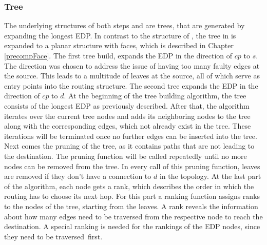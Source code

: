 \documentclass[conference]{IEEEtran}
\begin{document}
\subsubsection{Tree}
\label{precompTree}
The underlying structures of both steps  and  are trees, that are generated by expanding the longest EDP.
In contrast to the structure of , the tree in  is expanded to a planar structure with faces, which is described in Chapter \ref{precompFace}. 
The first tree build, expands the EDP in the direction of $cp$ to $s$.
The direction was chosen to address the issue of having too many faulty edges at the source. This leads to a multitude of leaves at the source, all of which serve as entry points into the routing structure.
The second tree expands the EDP in the direction of $cp$ to $d$.
At the beginning of the tree building algorithm, the tree consists of the longest EDP as previously described.
After that, the algorithm iterates over the current tree nodes and adds its neighboring nodes to the tree along with the corresponding edges, which not already exist in the tree.
These iterations will be terminated once no further edges can be inserted into the tree.
Next comes the pruning of the tree, as it contains paths that are not leading to the destination. The pruning function will be called repeatedly until no more nodes can be removed from the tree.
In every call of this pruning function, leaves are removed if they don't have a connection to $d$ in the topology.
At the last part of the algorithm, each node gets a rank, which describes the order in which the routing has to choose its next hop.
For this part a ranking function assigns ranks to the nodes of the tree, starting from the leaves.
A rank reveals the information about how many edges need to be traversed from the respective node to reach the destination.
A special ranking is needed for the rankings of the EDP nodes, since they need to be traversed~first.
\end{document}
